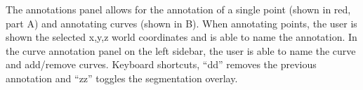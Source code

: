 \label{fig:annotate}
The annotations panel allows for the annotation of a single point (shown in red, part A) and annotating curves (shown in B). When annotating points, the user is shown the selected x,y,z world coordinates and is able to name the annotation. In the curve annotation panel on the left sidebar, the user is able to name the curve and add/remove curves. Keyboard shortcuts, ``dd'' removes the previous annotation and ``zz'' toggles the segmentation overlay.  